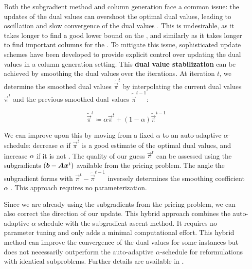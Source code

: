 Both the subgradient method and column generation face a common issue: the updates of the dual values can overshoot the optimal dual values, leading to oscillation and slow convergence of the dual values \cite{thebook, pessoa2013out, bastubbe2018computational}. This is undesirable, as it takes longer to find a good lower bound on the \IP{}, and similarly as it takes longer to find important columns for the \MP{}. To mitigate this issue, sophisticated update schemes have been developed to provide explicit control over updating the dual values in a column generation setting. This \textbf{dual value stabilization} can be achieved by smoothing the dual values over the iterations. At iteration $t$, we determine the smoothed dual values $\widetilde{\vec{\pi}}^t$ by interpolating the current dual values $\vec{\pi}^{t}$ and the previous smoothed dual values $\widetilde{\vec{\pi}}^{t-1}$:

\begin{equation*}
\widetilde{\vec{\pi}}^t \coloneqq \alpha \vec{\pi}^{t} + (1 - \alpha) \widetilde{\vec{\pi}}^{t-1}
\end{equation*}

We can improve upon this by moving from a fixed $\alpha$ to an auto-adaptive $\alpha$-schedule: decrease $\alpha$ if $\vec{\pi}^{t}$ is a good estimate of the optimal dual values, and increase $\alpha$ if it is not \cite{pessoa2013out,pessoa2018automation}. The quality of our guess $\vec{\pi}^{t}$ can be assessed using the subgradients $\left( {\bm{b}} - {\bm{A}} {\bm{x}}^t \right)$ available from the pricing problem. The angle the subgradient forms with $\vec{\pi}^{t} - \widetilde{\vec{\pi}}^{t-1}$ inversely determines the smoothing coefficient $\alpha$ \cite{pessoa2013out,pessoa2018automation}. This approach requires no parameterization.

Since we are already using the subgradients from the pricing problem, we can also correct the direction of our update. This hybrid approach combines the auto-adaptive $\alpha$-schedule with the subgradient ascent method. It requires no parameter tuning and only adds a minimal computational effort. This hybrid method can improve the convergence of the dual values for some instances but does not necessarily outperform the auto-adaptive $\alpha$-schedule for reformulations with identical subproblems. Further details are available in \cite{pessoa2013out, pessoa2018automation}.
